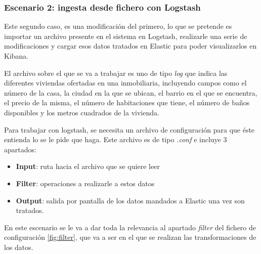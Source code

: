 \paragraph{}
\paragraph{}
\paragraph{}

\subsubsection{Escenario 2: ingesta desde fichero con Logstash}

Este segundo caso, es una modificación del primero, lo que se pretende es importar un archivo presente en el sistema en Logstash, realizarle una serie de modificaciones y cargar esos datos tratados en Elastic para poder visualizarlos en Kibana.

El archivo sobre el que se va a trabajar es uno de tipo \textit{log} que indica las diferentes viviendas ofertadas en una inmobiliaria, incluyendo campos como el número de la casa, la ciudad en la que se ubican, el barrio en el que se encuentra, el precio de la misma, el número de habitaciones que tiene, el número de baños disponibles y los metros cuadrados de la vivienda.

Para trabajar con logstash, se necesita un archivo de configuración para que éste entienda lo se le pide que haga. Este archivo es de tipo \textit{.conf} e incluye 3 apartados:
\begin{itemize}
    \item \textbf{Input}: ruta hacia el archivo que se quiere leer
    \item \textbf{Filter}: operaciones a realizarle a estos datos
    \item \textbf{Output}: salida por pantalla de los datos mandados a Elastic una vez son tratados.
\end{itemize}

En este escenario se le va a dar toda la relevancia al apartado \textit{filter} del fichero de configuración \ref{fig:filter}, que va a ser en el que se realizan las transformaciones de los datos. 

